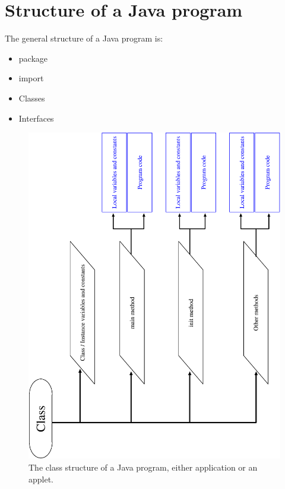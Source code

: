 \section{Structure of a Java program}
The general structure of a Java program is:
\begin{itemize}
\item package
\item import
\item Classes
\item Interfaces
\end{itemize}
\begin{figure}[h]
  \begin{center}
 \includegraphics[angle=-90,width=.8\textwidth]{Figures/ClassStructure.eps}
 \caption{The class structure of a Java program, either application or an applet.}
 \label{fig:ClassStructure}
  \end{center}
\end{figure}

